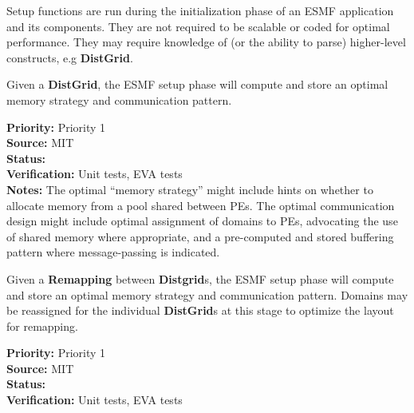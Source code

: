 

Setup functions are run during the initialization phase of an ESMF
application and its components. They are not required to be scalable
or coded for optimal performance. They may require knowledge of (or
the ability to parse) higher-level constructs, e.g \textbf{DistGrid}.


Given a \textbf{DistGrid}, the ESMF setup phase will compute and store
an optimal memory strategy and communication pattern.

\begin{reqlist}
  {\bf Priority:} Priority 1 \\
  {\bf Source:}  MIT \\
  {\bf Status:}  \\
  {\bf Verification:} Unit tests, EVA tests \\
  {\bf Notes:} The optimal ``memory strategy'' might include hints on
  whether to allocate memory from a pool shared between PEs. The
  optimal communication design might include optimal assignment of
  domains to PEs, advocating the use of shared memory where
  appropriate, and a pre-computed and stored buffering pattern where
  message-passing is indicated.
\end{reqlist}


Given a \textbf{Remapping} between \textbf{Distgrid}s, the ESMF setup
phase will compute and store an optimal memory strategy and
communication pattern. Domains may be reassigned for the individual
\textbf{DistGrid}s at this stage to optimize the layout for remapping.

\begin{reqlist}
{\bf Priority:} Priority 1 \\
{\bf Source:}  MIT \\
{\bf Status:}  \\
{\bf Verification:} Unit tests, EVA tests \\
\end{reqlist}


